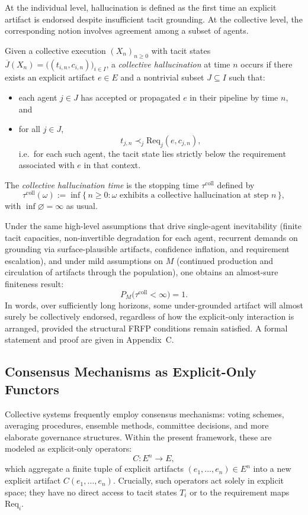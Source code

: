 \documentclass[11pt]{article}
\theoremstyle{definition}
\begin{document}
At the individual level, hallucination is defined as the first time an
explicit artifact is endorsed despite insufficient tacit grounding. At the
collective level, the corresponding notion involves agreement among a
subset of agents.

Given a collective execution $(X_n)_{n\ge 0}$ with tacit states
$\overline{J}(X_n) = \bigl((t_{i,n},c_{i,n})\bigr)_{i\in I}$, a
\emph{collective hallucination} at time $n$ occurs if there exists an
explicit artifact $e \in E$ and a nontrivial subset $J \subseteq I$ such
that:
\begin{itemize}
  \item each agent $j \in J$ has accepted or propagated $e$ in their
        pipeline by time $n$, and
  \item for all $j \in J$,
        \[
          t_{j,n} \prec_j \mathrm{Req}_j(e,c_{j,n}),
        \]
        i.e.\ for each such agent, the tacit state lies strictly below the
        requirement associated with $e$ in that context.
\end{itemize}

The \emph{collective hallucination time} is the stopping time
$\tau^{\mathrm{coll}}$ defined by
\[
  \tau^{\mathrm{coll}}(\omega)
  := \inf\{\,n \ge 0 : \omega \text{ exhibits a collective hallucination at
      step } n\,\},
\]
with $\inf \varnothing = \infty$ as usual.

Under the same high-level assumptions that drive single-agent inevitability
(finite tacit capacities, non-invertible degradation for each agent,
recurrent demands on grounding via surface-plausible artifacts, confidence
inflation, and requirement escalation), and under mild assumptions on $M$
(continued production and circulation of artifacts through the population),
one obtains an almost-sure finiteness result:
\[
  P_M\bigl(\tau^{\mathrm{coll}} < \infty\bigr) = 1.
\]
In words, over sufficiently long horizons, some under-grounded artifact
will almost surely be collectively endorsed, regardless of how the
explicit-only interaction is arranged, provided the structural FRFP
conditions remain satisfied. A formal statement and proof are given in
Appendix~C.

\subsection{Consensus Mechanisms as Explicit-Only Functors}

Collective systems frequently employ consensus mechanisms: voting schemes,
averaging procedures, ensemble methods, committee decisions, and more
elaborate governance structures. Within the present framework, these are
modeled as explicit-only operators:
\[
  C : E^n \longrightarrow E,
\]
which aggregate a finite tuple of explicit artifacts
$(e_1,\dots,e_n) \in E^n$ into a new explicit artifact $C(e_1,\dots,e_n)$.
Crucially, such operators act solely in explicit space; they have no direct
access to tacit states $T_i$ or to the requirement maps $\mathrm{Req}_i$.
\end{document}

